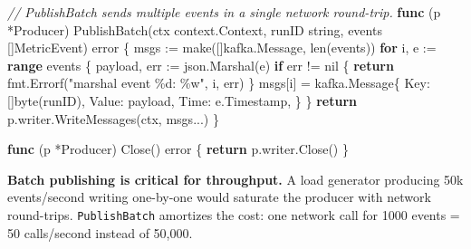 \documentclass[
]{article}
\newenvironment{Shaded}{}{}
\newcommand{\BuiltInTok}[1]{\textcolor[rgb]{0.00,0.50,0.00}{#1}}
\newcommand{\CommentTok}[1]{\textcolor[rgb]{0.38,0.63,0.69}{\textit{#1}}}
\newcommand{\ControlFlowTok}[1]{\textcolor[rgb]{0.00,0.44,0.13}{\textbf{#1}}}
\newcommand{\DataTypeTok}[1]{\textcolor[rgb]{0.56,0.13,0.00}{#1}}
\newcommand{\KeywordTok}[1]{\textcolor[rgb]{0.00,0.44,0.13}{\textbf{#1}}}
\newcommand{\NormalTok}[1]{#1}
\newcommand{\OperatorTok}[1]{\textcolor[rgb]{0.40,0.40,0.40}{#1}}
\newcommand{\OtherTok}[1]{\textcolor[rgb]{0.00,0.44,0.13}{#1}}
\newcommand{\StringTok}[1]{\textcolor[rgb]{0.25,0.44,0.63}{#1}}
\begin{document}
\begin{Shaded}
\begin{Highlighting}[]
\CommentTok{// PublishBatch sends multiple events in a single network round{-}trip.}
\KeywordTok{func} \OperatorTok{(}\NormalTok{p }\OperatorTok{*}\NormalTok{Producer}\OperatorTok{)}\NormalTok{ PublishBatch}\OperatorTok{(}\NormalTok{ctx context}\OperatorTok{.}\NormalTok{Context}\OperatorTok{,}\NormalTok{ runID }\DataTypeTok{string}\OperatorTok{,}\NormalTok{ events }\OperatorTok{[]}\NormalTok{MetricEvent}\OperatorTok{)} \DataTypeTok{error} \OperatorTok{\{}
\NormalTok{    msgs }\OperatorTok{:=} \BuiltInTok{make}\OperatorTok{([]}\NormalTok{kafka}\OperatorTok{.}\NormalTok{Message}\OperatorTok{,} \BuiltInTok{len}\OperatorTok{(}\NormalTok{events}\OperatorTok{))}
    \ControlFlowTok{for}\NormalTok{ i}\OperatorTok{,}\NormalTok{ e }\OperatorTok{:=} \KeywordTok{range}\NormalTok{ events }\OperatorTok{\{}
\NormalTok{        payload}\OperatorTok{,}\NormalTok{ err }\OperatorTok{:=}\NormalTok{ json}\OperatorTok{.}\NormalTok{Marshal}\OperatorTok{(}\NormalTok{e}\OperatorTok{)}
        \ControlFlowTok{if}\NormalTok{ err }\OperatorTok{!=} \OtherTok{nil} \OperatorTok{\{}
            \ControlFlowTok{return}\NormalTok{ fmt}\OperatorTok{.}\NormalTok{Errorf}\OperatorTok{(}\StringTok{"marshal event \%d: \%w"}\OperatorTok{,}\NormalTok{ i}\OperatorTok{,}\NormalTok{ err}\OperatorTok{)}
        \OperatorTok{\}}
\NormalTok{        msgs}\OperatorTok{[}\NormalTok{i}\OperatorTok{]} \OperatorTok{=}\NormalTok{ kafka}\OperatorTok{.}\NormalTok{Message}\OperatorTok{\{}
\NormalTok{            Key}\OperatorTok{:}   \OperatorTok{[]}\DataTypeTok{byte}\OperatorTok{(}\NormalTok{runID}\OperatorTok{),}
\NormalTok{            Value}\OperatorTok{:}\NormalTok{ payload}\OperatorTok{,}
\NormalTok{            Time}\OperatorTok{:}\NormalTok{  e}\OperatorTok{.}\NormalTok{Timestamp}\OperatorTok{,}
        \OperatorTok{\}}
    \OperatorTok{\}}
    \ControlFlowTok{return}\NormalTok{ p}\OperatorTok{.}\NormalTok{writer}\OperatorTok{.}\NormalTok{WriteMessages}\OperatorTok{(}\NormalTok{ctx}\OperatorTok{,}\NormalTok{ msgs}\OperatorTok{...)}
\OperatorTok{\}}

\KeywordTok{func} \OperatorTok{(}\NormalTok{p }\OperatorTok{*}\NormalTok{Producer}\OperatorTok{)}\NormalTok{ Close}\OperatorTok{()} \DataTypeTok{error} \OperatorTok{\{}
    \ControlFlowTok{return}\NormalTok{ p}\OperatorTok{.}\NormalTok{writer}\OperatorTok{.}\NormalTok{Close}\OperatorTok{()}
\OperatorTok{\}}
\end{Highlighting}
\end{Shaded}

\textbf{Batch publishing is critical for throughput.} A load generator
producing 50k events/second writing one-by-one would saturate the
producer with network round-trips. \texttt{PublishBatch} amortizes the
cost: one network call for 1000 events = 50 calls/second instead of
50,000.
\end{document}
